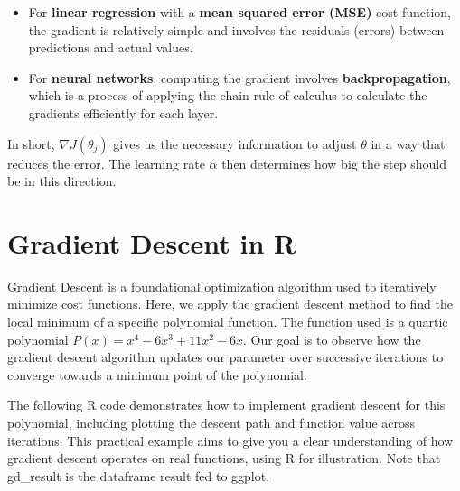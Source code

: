 \documentclass[
  12 pt,
  a4paper,
]{book}
\providecommand{\tightlist}{%
  \setlength{\itemsep}{0pt}\setlength{\parskip}{0pt}}
\numberwithin{equation}{section}
\theoremstyle{plain}      %
\theoremstyle{definition} %
\theoremstyle{remark}     %
\theoremstyle{note}         %
\begin{document}
\begin{itemize}
  \begin{itemize}
  \tightlist
  \item
    For \textbf{linear regression} with a \textbf{mean squared error
    (MSE)} cost function, the gradient is relatively simple and involves
    the residuals (errors) between predictions and actual values.
  \item
    For \textbf{neural networks}, computing the gradient involves
    \textbf{backpropagation}, which is a process of applying the chain
    rule of calculus to calculate the gradients efficiently for each
    layer.
  \end{itemize}
\end{itemize}

In short, \(\nabla J(\theta_j)\) gives us the necessary information to
adjust \(\theta\) in a way that reduces the error. The learning rate
\(\alpha\) then determines how big the step should be in this direction.

\newpage

\hypertarget{gradient-descent-in-r}{%
\section{Gradient Descent in R}\label{gradient-descent-in-r}}

Gradient Descent is a foundational optimization algorithm used to
iteratively minimize cost functions. Here, we apply the gradient descent
method to find the local minimum of a specific polynomial function. The
function used is a quartic polynomial
\(P(x) = x^4 - 6x^3 + 11x^2 - 6x\). Our goal is to observe how the
gradient descent algorithm updates our parameter over successive
iterations to converge towards a minimum point of the polynomial.

The following R code demonstrates how to implement gradient descent for
this polynomial, including plotting the descent path and function value
across iterations. This practical example aims to give you a clear
understanding of how gradient descent operates on real functions, using
R for illustration. Note that gd\_result is the dataframe result fed to
ggplot.\\

\begin{lstlisting}[caption={\raggedright Gradient Descent: Over a Polynomial}, label={lst:GradDec1}]
\end{lstlisting}
\scriptsize
\end{document}
